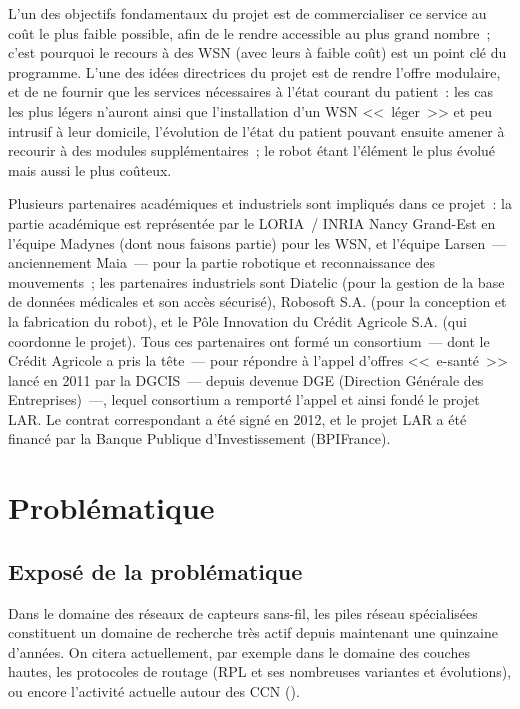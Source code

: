 L'un des objectifs fondamentaux du projet est de commercialiser ce
service au coût le plus faible possible, afin de le rendre accessible
au plus grand nombre~; c'est pourquoi le recours à des WSN (avec leurs
 à faible coût) est un point clé du programme. L'une des
idées directrices du projet est de rendre l'offre modulaire, et de ne
fournir que les services nécessaires à l'état courant du patient~:
les cas les plus légers n'auront ainsi que l'installation d'un WSN
<<~léger~>> et peu intrusif à leur domicile, l'évolution de l'état
du patient pouvant ensuite amener à recourir à des modules
supplémentaires~; le robot étant l'élément le plus évolué mais aussi
le plus coûteux.

Plusieurs partenaires académiques et industriels sont impliqués dans
ce projet~: la partie académique est représentée par le LORIA~/ INRIA
Nancy Grand-Est en l'équipe Madynes (dont nous faisons partie) pour les
WSN, et l'équipe Larsen~--- anciennement Maia~--- pour la partie robotique
et reconnaissance des mouvements~; les partenaires industriels sont
Diatelic (pour la gestion de la base de données médicales et son accès
sécurisé), Robosoft S.A. (pour la conception et la fabrication du robot),
et le Pôle Innovation du Crédit Agricole S.A. (qui coordonne le projet).
Tous ces partenaires ont formé un consortium~--- dont le Crédit Agricole
a pris la tête~--- pour répondre à l'appel d'offres <<~e-santé~>> lancé
en 2011 par la DGCIS~--- depuis devenue DGE (Direction Générale des
Entreprises)~---, lequel consortium a remporté l'appel et ainsi fondé
le projet LAR. Le contrat correspondant a été signé en 2012, et le projet
LAR a été financé par la Banque Publique d'Investissement (BPIFrance).


\section{Problématique}
\label{SecProblematique}


\subsection{Exposé de la problématique}
\label{SubsecExposeProblematique}

Dans le domaine des réseaux de capteurs sans-fil, les piles réseau
spécialisées constituent un domaine de recherche très actif depuis
maintenant une quinzaine d'années. On citera actuellement, par exemple
dans le domaine des couches hautes, les protocoles de routage (RPL et ses
nombreuses variantes et évolutions), ou encore l'activité actuelle autour
des CCN ().

